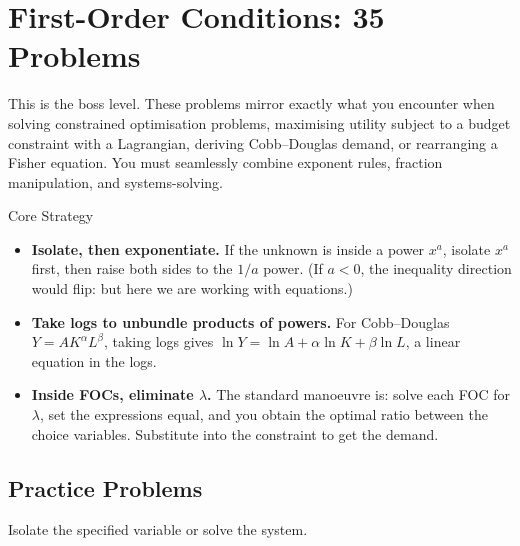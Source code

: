 \chapter{First-Order Conditions: 35 Problems}

This is the boss level. These problems mirror exactly what you encounter
when solving constrained optimisation problems, maximising utility
subject to a budget constraint with a Lagrangian, deriving Cobb--Douglas
demand, or rearranging a Fisher equation. You must seamlessly combine
exponent rules, fraction manipulation, and systems-solving.

\begin{rulebox}{Core Strategy}
\begin{itemize}[leftmargin=1.6em,itemsep=0.3ex]
  \item \textbf{Isolate, then exponentiate.} If the unknown is inside a
        power $x^a$, isolate $x^a$ first, then raise both sides to the
        $1/a$ power. \;(If $a < 0$, the inequality direction would flip:
        but here we are working with equations.)
  \item \textbf{Take logs to unbundle products of powers.} For
        Cobb--Douglas $Y = A K^\alpha L^\beta$, taking logs gives
        $\ln Y = \ln A + \alpha \ln K + \beta \ln L$, a linear equation
        in the logs.
  \item \textbf{Inside FOCs, eliminate $\lambda$.} The standard
        manoeuvre is: solve each FOC for $\lambda$, set the expressions
        equal, and you obtain the optimal ratio between the choice
        variables. Substitute into the constraint to get the demand.
\end{itemize}
\end{rulebox}

\section{Practice Problems}

Isolate the specified variable or solve the system.

